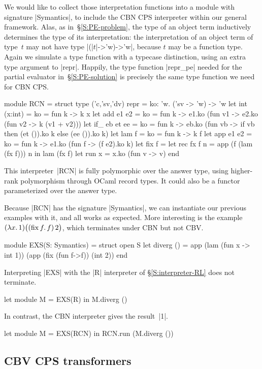 We would like to collect those interpretation functions into a module
with signature |Symantics|, to include the CBN CPS interpreter within our
general framework. Alas, as in~\S\ref{S:PE-problem}, the type of
an object term inductively determines the type of its interpretation:
the interpretation of an object term of type~$t$ may not have type
|(|$t$|->'w)->'w|, because $t$ may be a function type.  Again we
simulate a type function with a typecase distinction, using an extra
type argument to |repr|. Happily, the type function |repr_pe| needed for
the partial evaluator 
in~\S\ref{S:PE-solution} is precisely the same type function we
need for CBN CPS\@.
\begin{code}
module RCN = struct
  type ('c,'sv,'dv) repr = {ko: 'w. ('sv -> 'w) -> 'w}
  let int (x:int) = {ko = fun k -> k x}
  let add e1 e2 = {ko = fun k ->
      e1.ko (fun v1 -> e2.ko (fun v2 -> k (v1 + v2)))}
  let if_ eb et ee = {ko = fun k ->
      eb.ko (fun vb -> if vb then (et ()).ko k else (ee ()).ko k)}
  let lam f = {ko = fun k -> k f}
  let app e1 e2 = {ko = fun k -> e1.ko (fun f -> (f e2).ko k)}
  let fix f = let rec fx f n = app (f (lam (fx f))) n in lam (fx f)
  let run x = x.ko (fun v -> v)
end
\end{code}

This interpreter~|RCN| is fully polymorphic over the answer type,
using higher-rank polymorphism through OCaml record types.
It could also be a functor parameterized over
the answer type.

Because |RCN| has the signature |Symantics|, we can instantiate our previous
examples with it, and all works as expected.  More interesting
is the example $(\mathopen{\lambda\mathord{x}.\,}1)\bigl((\mathopen{\mathrm{fix\,}\mathord{f}.\,}f)\mathinner2\bigr)$, which terminates
under CBN but not CBV\@.
\begin{code}
module EXS(S: Symantics) = struct open S
 let diverg () = app (lam (fun x -> int 1)) 
                     (app (fix (fun f->f)) (int 2))
end
\end{code}
Interpreting |EXS| with the |R| interpreter of
\S\ref{S:interpreter-RL} does not terminate.
\begin{code}
let module M = EXS(R) in M.diverg ()
\end{code}
In contrast, the CBN interpreter gives the result~|1|.
\begin{code}
let module M = EXS(RCN) in RCN.run (M.diverg ())
\end{code}

\subsection{CBV CPS transformers}

